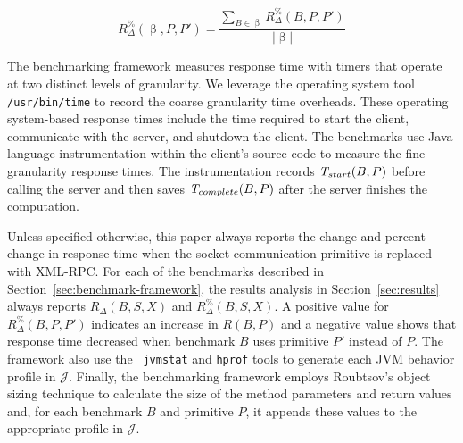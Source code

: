 \documentclass{sig-alternate}
\begin{document}
\vspace*{-.1in}

\begin{equation} \label{eq:time_percent_incr_set}
R_\Delta^\%(\upbeta,P,P')  = \frac{\displaystyle \sum_{B\in\upbeta} R_\Delta^\% (B,P,P')}
                          {|\upbeta|} 
\end{equation}

\begin{sloppypar}
The benchmarking framework measures response time with timers that
operate at two distinct levels of granularity.  We leverage the
operating system tool \texttt{/usr/bin/time} to record the coarse
granularity time overheads.  These operating system-based response
times include the time required to start the client, communicate with
the server, and shutdown the client.  The benchmarks use Java language
instrumentation within the client's source code to measure the fine
granularity response times.  The instrumentation records $\mbox{{\em
    T}}_{start}(B,P)$ before calling the server and then saves
$\mbox{{\em T}}_{complete}(B,P)$ after the server finishes the
computation.
\end{sloppypar}

\begin{sloppypar}
Unless specified otherwise, this paper always reports the change and
percent change in response time when the socket communication
primitive is replaced with XML-RPC.  For each of the benchmarks
described in Section~\ref{sec:benchmark-framework}, the results
analysis in Section~\ref{sec:results} always reports $R_\Delta(B,S,X)$
and {\small $R_\Delta^\%(B,S,X)$}.  A positive value for {\small
  $R_\Delta^\%(B,P,P')$} indicates an increase in $R(B,P)$ and a
negative value shows that response time decreased when benchmark $B$
uses primitive $P'$ instead of $P$.  The framework also use the {\tt
  jvmstat} and {\tt hprof} tools to generate each JVM behavior profile
in $\mathcal{J}$.  Finally, the benchmarking framework employs
Roubtsov's object sizing technique \cite{roubtsov-sizing} to calculate
the size of the method parameters and return values and, for each
benchmark $B$ and primitive $P$, it appends these values to the
appropriate profile in $\mathcal{J}$.
\end{sloppypar}


\end{document}
